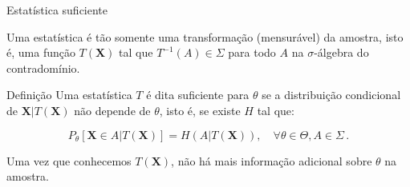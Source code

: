 \documentclass[11pt]{beamer}
\newenvironment{halfwideitemize}{\itemize\addtolength{\itemsep}{0.5em}}{\enditemize}
\begin{document}
	
	\begin{frame}{Estatística suficiente}
		\begin{halfwideitemize}
			\item Uma estatística é tão somente uma transformação (mensurável) da amostra, isto é, uma função $T(\boldsymbol{X})$ tal que $T^{-1}(A) \in \Sigma$ para todo $A$ na $\sigma$-álgebra do contradomínio.
			\begin{block}{Definição}
				Uma estatística $T$ é dita suficiente para $\theta$ se a distribuição condicional de $\boldsymbol{X}|T(\boldsymbol{X})$ não depende de $\theta$, isto é, se existe $H$ tal que:
				
				\begin{equation*}
					P_\theta[\boldsymbol{X} \in A|T(\boldsymbol{X})] = H(A|T(\boldsymbol{X})), \quad \forall \theta \in \Theta, A \in \Sigma \, .
				\end{equation*}
				
			\end{block}
			\item Uma vez que conhecemos $T(\boldsymbol{X})$, não há mais informação adicional sobre $\theta$ na amostra.
			\item 
		\end{halfwideitemize}
		
	\end{frame}
	
\end{document}
